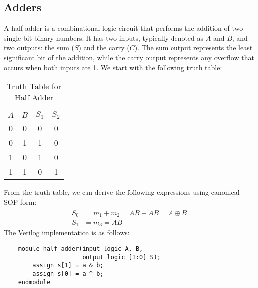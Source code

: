 \documentclass[11pt]{report}
\begin{document}
\subsection{Adders}
\begin{definition}
    A half adder is a combinational logic circuit that performs the addition of two single-bit binary numbers. It has two inputs, typically denoted as $A$ and $B$, and two outputs: the sum ($S$) and the carry ($C$). The sum output represents the least significant bit of the addition, while the carry output represents any overflow that occurs when both inputs are 1. We start with the following truth table:
    \begin{table}[h!]
        \centering
        \begin{tabular}{|c|c|c|c|}
            \hline
            $A$ & $B$ & $S_1$ & $S_2$ \\
            \hline
            0 & 0 & 0 & 0 \\
            0 & 1 & 1 & 0 \\    
            1 & 0 & 1 & 0 \\
            1 & 1 & 0 & 1 \\
            \hline
        \end{tabular}
        \caption{Truth Table for Half Adder}
        \label{tab:half_adder_truth_table}
    \end{table}
    From the truth table, we can derive the following expressions using canonical SOP form:
    \begin{align*}
        S_0 &= m_1 + m_2 = \overline{A}B + A\overline{B} = A \oplus B \\
        S_1 &= m_3 = AB
    \end{align*}
    The Verilog implementation is as follows:
    \begin{verbatim}
    module half_adder(input logic A, B,
                      output logic [1:0] S);
        assign s[1] = a & b;
        assign s[0] = a ^ b;
    endmodule
    \end{verbatim}
\end{definition}
\end{document}

